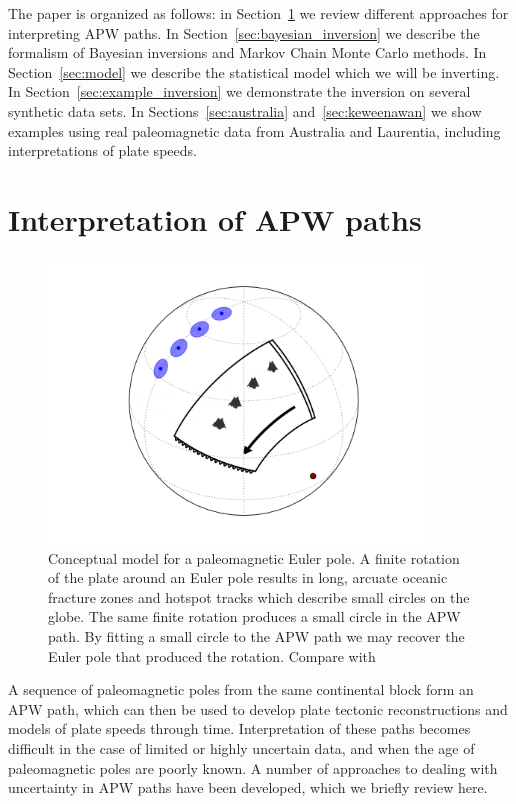 \documentclass[preprint,12pt,authoryear]{elsarticle}
\begin{document}
The paper is organized as follows: in Section~\ref{sec:apwp} we review different
approaches for interpreting APW paths. In Section~\ref{sec:bayesian_inversion} we
describe the formalism of Bayesian inversions and Markov Chain Monte Carlo methods.
In Section~\ref{sec:model} we describe the statistical model which we will be inverting.
In Section~\ref{sec:example_inversion} we demonstrate the inversion on several
synthetic data sets. In Sections~\ref{sec:australia} and~\ref{sec:keweenawan}
we show examples using real paleomagnetic data from Australia and Laurentia,
including interpretations of plate speeds.

\section{Interpretation of APW paths}
\label{sec:apwp}
\begin{figure}
\includegraphics[width=0.9\textwidth]{figures/cartoon/paleomagnetic_euler_pole.png}
\caption[Conceptual model for a paleomagnetic Euler pole.]{Conceptual model for a paleomagnetic Euler pole. A finite rotation of the plate around an Euler pole results in long, arcuate oceanic fracture zones and hotspot tracks which describe small circles on the globe. The same finite rotation produces a small circle in the APW path. By fitting a small circle to the APW path we may recover the Euler pole that produced the rotation. Compare with \citet{gordon1984paleomagnetic}}
\label{fig:pep}
\end{figure}
A sequence of paleomagnetic poles from the same continental block form an APW path,
which can then be used to develop plate tectonic reconstructions and models
of plate speeds through time. Interpretation of these paths becomes difficult in the
case of limited or highly uncertain data, and when the age of paleomagnetic poles are poorly
known. A number of approaches to dealing with uncertainty in APW paths have been developed,
which we briefly review here.
\end{document}
